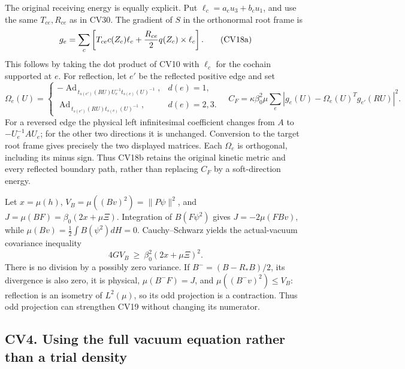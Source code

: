 \documentclass[11pt]{article}
\begin{document}
The original receiving energy is equally explicit. Put
\(\ell_c=a_cu_3+b_cu_1\), and use the same \(T_{ce},R_{ce}\) as in
CV30. The gradient of \(S\) in the orthonormal root frame is
\[
 g_e=\sum_c\left[T_{ce}c(Z_c)\ell_c+
                       {R_{ce}\over2}q(Z_c)\times\ell_c\right].
                                                               \tag{CV18a}
\]
This follows by taking the dot product of CV10 with \(\ell_c\) for
the cochain supported at \(e\). For reflection, let \(e'\) be the
reflected positive edge and set
\[
 \Omega_e(U)=
 \begin{cases}
 -\operatorname{Ad}_{\,t_{s(e')}(RU)U_e^{-1}t_{s(e)}(U)^{-1}},
                                                   &d(e)=1,\\
 \operatorname{Ad}_{\,t_{s(e')}(RU)t_{s(e)}(U)^{-1}},
                                                   &d(e)=2,3 .
 \end{cases}
\quad
 C_F=\kappa\beta_0^2\mu\sum_e
       |g_e(U)-\Omega_e(U)^Tg_{e'}(RU)|^2.              \tag{CV18b}
\]
For a reversed edge the physical left infinitesimal coefficient
changes from \(A\) to \(-U_e^{-1}AU_e\); for the other two directions
it is unchanged. Conversion to the target root frame gives precisely
the two displayed matrices. Each \(\Omega_e\) is orthogonal,
including its minus sign. Thus CV18b retains the original kinetic
metric and every reflected boundary path, rather than replacing
\(C_F\) by a soft-direction energy.

Let \(x=\mu(h)\), \(V_B=\mu((Bv)^2)=\|P\psi\|^2\), and
\(J=\mu(BF)=\beta_0(2x+\mu\Xi)\). Integration of
\(B(F\psi^2)\) gives \(J=-2\mu(FBv)\), while
\(\mu(Bv)=\frac12\int B(\psi^2)dH=0\). Cauchy--Schwarz yields the
actual-vacuum covariance inequality
\[
             4G V_B\ \ge\ \beta_0^2(2x+\mu\Xi)^2.       \tag{CV19}
\]
There is no division by a possibly zero variance. If
\(B^-=(B-R_*B)/2\), its divergence is also zero, it is physical,
\(\mu(B^-F)=J\), and \(\mu((B^-v)^2)\le V_B\): reflection is an
isometry of \(L^2(\mu)\), so its odd projection is a contraction.
Thus odd projection can strengthen CV19 without changing its numerator.

\subsection*{CV4. Using the full vacuum equation rather than a trial density}
\end{document}
